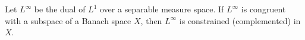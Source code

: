 Let $L^\infty$ be the dual of $L^1$ over a separable measure space. If $L^\infty$ is congruent with a subspace of a Banach space $X$, then $L^\infty$ is constrained (complemented) in $X$.